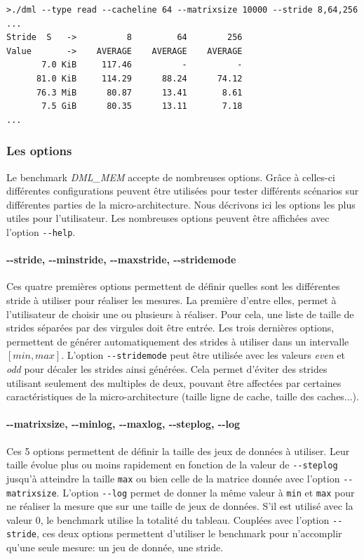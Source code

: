\begin{verbatim}
>./dml --type read --cacheline 64 --matrixsize 10000 --stride 8,64,256
...
Stride  S   ->          8         64        256
Value       ->    AVERAGE    AVERAGE    AVERAGE
       7.0 KiB     117.46          -          -
      81.0 KiB     114.29      88.24      74.12
      76.3 MiB      80.87      13.41       8.61
       7.5 GiB      80.35      13.11       7.18
...
\end{verbatim}

  

    \subsubsection{Les options}
        Le benchmark \textit{DML\_MEM} accepte de nombreuses options. Grâce à celles-ci différentes configurations peuvent être utilisées pour tester différents scénarios sur différentes parties de la micro-architecture. Nous décrivons ici les options les plus utiles pour l'utilisateur. Les nombreuses options peuvent être affichées avec l'option \verb|--help|.
        
        
        \paragraph{-{}-stride, -{}-minstride, -{}-maxstride, -{}-stridemode} Ces quatre premières options permettent de définir quelles sont les différentes stride à utiliser pour réaliser les mesures. La première d'entre elles, permet à l'utilisateur de choisir une ou plusieurs à réaliser. Pour cela, une liste de taille de strides séparées par des virgules doit être entrée. Les trois dernières options, permettent de générer automatiquement des strides à utiliser dans un intervalle $[min, max]$. L'option \verb|--stridemode| peut être utilisée avec les valeurs \textit{even} et \textit{odd} pour décaler les strides ainsi générées. Cela permet d'éviter des strides utilisant seulement des multiples de deux, pouvant être affectées par certaines caractéristiques de la micro-architecture (taille ligne de cache, taille des caches...). 
        
        \paragraph{-{}-matrixsize, -{}-minlog, -{}-maxlog, -{}-steplog, -{}-log} Ces 5 options permettent de définir la taille des jeux de données à utiliser. Leur taille évolue plus ou moins rapidement en fonction de la valeur de \verb|--steplog| jusqu'à atteindre la taille \verb|max| ou bien celle de la matrice donnée avec l'option \verb|--matrixsize|. L'option \verb|--log| permet de donner la même valeur à \verb|min| et \verb|max| pour ne réaliser la mesure que sur une taille de jeux de données. S'il est utilisé avec la valeur $0$, le benchmark utilise la totalité du tableau. Couplées avec l'option \verb|--stride|, ces deux options permettent d'utiliser le benchmark pour n'accomplir qu'une seule mesure: un jeu de donnée, une stride.
        
